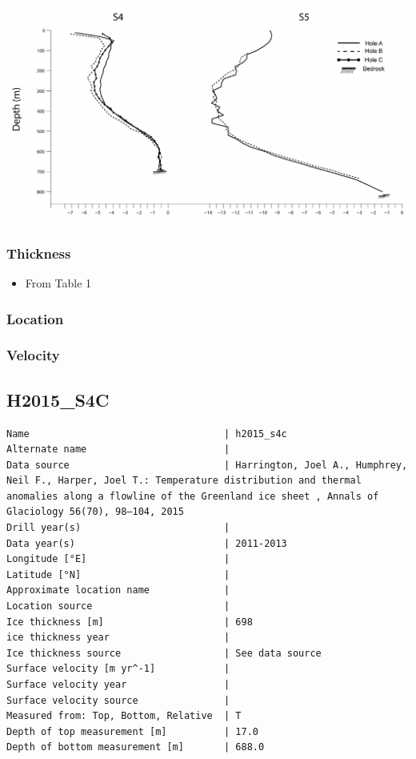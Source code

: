 \documentclass[article,a4paper,times,11pt,twoside]{article}
\begin{document}
\begin{center}
\includegraphics[width=.9\linewidth]{h2015_s4b/harrington_2015_fig2_S4_S5.png}
\end{center}

\subsubsection{Thickness}
\label{sec:org210a883}

\begin{itemize}
\item From \textcite{harrington_2015} Table 1
\end{itemize}

\subsubsection{Location}
\label{sec:org1e4c56d}

\subsubsection{Velocity}
\label{sec:org54e7d54}
\clearpage
\subsection{H2015\_S4C}
\label{sec:orgd922486}
\begin{verbatim}
Name                                  | h2015_s4c
Alternate name                        | 
Data source                           | Harrington, Joel A., Humphrey, Neil F., Harper, Joel T.: Temperature distribution and thermal anomalies along a flowline of the Greenland ice sheet , Annals of Glaciology 56(70), 98–104, 2015 
Drill year(s)                         | 
Data year(s)                          | 2011-2013
Longitude [°E]                        | 
Latitude [°N]                         | 
Approximate location name             | 
Location source                       | 
Ice thickness [m]                     | 698
ice thickness year                    | 
Ice thickness source                  | See data source
Surface velocity [m yr^-1]            | 
Surface velocity year                 | 
Surface velocity source               | 
Measured from: Top, Bottom, Relative  | T
Depth of top measurement [m]          | 17.0
Depth of bottom measurement [m]       | 688.0
\end{verbatim}
\end{document}
